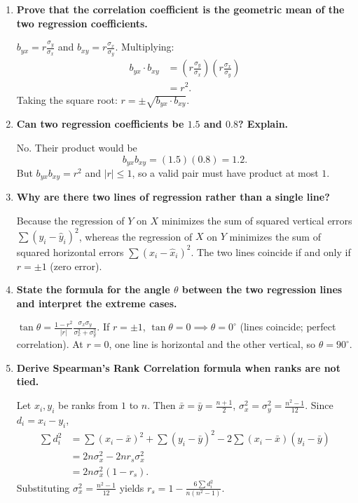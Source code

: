 \documentclass[12pt,a4paper]{article}
\newcommand{\Q}[1]{\textbf{#1}\par\noindent\ignorespaces}
\begin{document}
\begin{tcolorbox}[exambox, title={\textbf{Frequently Asked / Viva Questions}}]
\begin{enumerate}[topsep=0pt, label=\textbf{Q\arabic*.}, itemsep=5pt]
  \item \Q{Prove that the correlation coefficient is the geometric mean of the two regression coefficients.}
  $b_{yx} = r \frac{\sigma_y}{\sigma_x}$ and $b_{xy} = r \frac{\sigma_x}{\sigma_y}$. Multiplying:
  \[
    \begin{aligned}
      b_{yx} \cdot b_{xy} &= \left(r\frac{\sigma_y}{\sigma_x}\right)\left(r\frac{\sigma_x}{\sigma_y}\right) \\[3pt]
      &= r^2.
    \end{aligned}
  \]
   Taking the square root: $r = \pm \sqrt{b_{yx} \cdot b_{xy}}$.

  \item \Q{Can two regression coefficients be $1.5$ and $0.8$? Explain.}
  No. Their product would be
  \[
    b_{yx} b_{xy} = (1.5)(0.8) = 1.2.
  \]
  But $b_{yx}b_{xy}=r^2$ and $|r|\le 1$, so a valid pair must have product at most $1$.
  \item \Q{Why are there two lines of regression rather than a single line?}
  Because the regression of $Y$ on $X$ minimizes the sum of squared vertical errors $\sum (y_i - \hat{y}_i)^2$, whereas the regression of $X$ on $Y$ minimizes the sum of squared horizontal errors $\sum (x_i - \hat{x}_i)^2$. The two lines coincide if and only if $r = \pm 1$ (zero error).

  \item \Q{State the formula for the angle $\theta$ between the two regression lines and interpret the extreme cases.}
  $\tan\theta = \frac{1-r^2}{|r|}\frac{\sigma_x \sigma_y}{\sigma_x^2 + \sigma_y^2}$. If $r = \pm 1$, $\tan\theta = 0 \implies \theta = 0^\circ$ (lines coincide; perfect correlation). At $r=0$, one line is horizontal and the other vertical, so $\theta=90^\circ$.

  \item \Q{Derive Spearman's Rank Correlation formula when ranks are not tied.}
  Let $x_i, y_i$ be ranks from $1$ to $n$. Then $\bar{x} = \bar{y} = \frac{n+1}{2}$, $\sigma_x^2 = \sigma_y^2 = \frac{n^2-1}{12}$. Since $d_i = x_i - y_i$,
  \[
    \begin{aligned}
      \sum d_i^2 &= \sum (x_i - \bar{x})^2 + \sum (y_i - \bar{y})^2 - 2\sum (x_i - \bar{x})(y_i - \bar{y}) \\[3pt]
      &= 2n\sigma_x^2 - 2n r_s \sigma_x^2 \\[3pt]
      &= 2n\sigma_x^2(1 - r_s).
    \end{aligned}
  \]
   Substituting $\sigma_x^2 = \frac{n^2-1}{12}$ yields $r_s = 1 - \frac{6\sum d_i^2}{n(n^2-1)}$.
\end{enumerate}
\end{tcolorbox}
\end{document}
